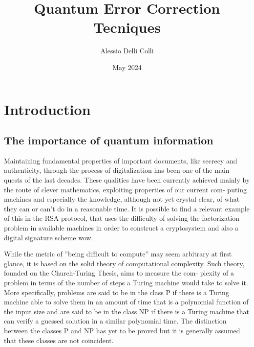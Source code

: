 \documentclass{article}
\title{Quantum Error Correction Tecniques}
\author{Alessio Delli Colli}
\date{May 2024}
\begin{document}
\maketitle

\newpage

\tableofcontents

\newpage

\section{Introduction}

\vspace{10pt}

\subsection{The importance of quantum information}

\vspace{10pt}

Maintaining fundamental properties of important documents, like secrecy
and authenticity, through the process of digitalization has been one of the main
quests of the last decades. These qualities have been currently achieved mainly
by the route of clever mathematics, exploiting properties of our current com-
puting machines and especially the knowledge, although not yet crystal clear,
of what they can or can’t do in a reasonable time.
It is possible to find a relevant example of this in the RSA protocol, that uses
the difficulty of solving the factorization problem in available machines in order
to construct a cryptosystem and also a digital signature scheme wow.

\vspace{10pt}

While the metric of ”being difficult to compute” may seem arbitrary at first
glance, it is based on the solid theory of computational complexity.
Such theory, founded on the Church-Turing Thesis, aims to measure the com-
plexity of a problem in terms of the number of steps a Turing machine would
take to solve it.
More specifically, problems are said to be in the class P if there is a Turing
machine able to solve them in an amount of time that is a polynomial function
of the input size and are said to be in the class NP if there is a Turing machine
that can verify a guessed solution in a similar polynomial time.
The distinction between the classes P and NP has yet to be proved but it is
generally assumed that these classes are not coincident.
\end{document}
